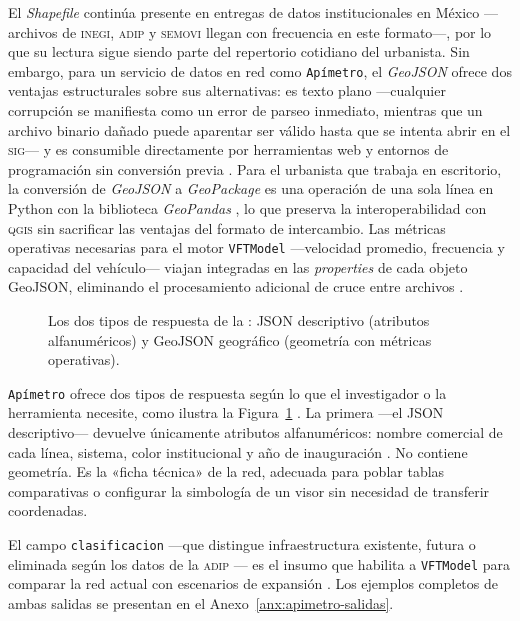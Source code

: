 El \textit{Shapefile} continúa presente en entregas de datos institucionales en
México —archivos de \textsc{inegi}, \textsc{adip} y \textsc{semovi} llegan con
frecuencia en este formato—, por lo que su lectura sigue siendo parte del
repertorio cotidiano del urbanista. Sin embargo, para un servicio de datos en
red como \texttt{Apímetro}, el \textit{GeoJSON} ofrece dos ventajas
estructurales sobre sus alternativas: es texto plano —cualquier corrupción se
manifiesta como un error de parseo inmediato, mientras que un archivo binario
dañado puede aparentar ser válido hasta que se intenta abrir en el \textsc{sig}—
y es consumible directamente por herramientas web y entornos de programación sin
conversión previa \citep{butler2016geojson}. Para el urbanista que trabaja en
escritorio, la conversión de \textit{GeoJSON} a \textit{GeoPackage} es una
operación de una sola línea en Python con la biblioteca \textit{GeoPandas}
\citep{tycgis2025}, lo que preserva la interoperabilidad con \textsc{qgis} sin
sacrificar las ventajas del formato de intercambio. Las métricas operativas
necesarias para el motor \texttt{VFTModel} —velocidad promedio, frecuencia y
capacidad del vehículo— viajan integradas en las \textit{properties} de cada
objeto GeoJSON, eliminando el procesamiento adicional de cruce entre archivos
\citep{cabrera2026VFTModel}.

\label{subsec:estructura-geojson-descriptivo}

\begin{figure}[H]
    \centering
    
    \caption[Tipos de salida de \texttt{Apímetro}]{Los dos tipos de respuesta de
    la \api{}: JSON descriptivo (atributos alfanuméricos) y GeoJSON
    geográfico (geometría con métricas operativas).}
    \label{fig:apimetro-salidas-tipos}
\end{figure}

\texttt{Apímetro} ofrece dos tipos de respuesta según lo que el investigador o
la herramienta necesite, como ilustra la
Figura~\ref{fig:apimetro-salidas-tipos} . La primera —el JSON descriptivo— devuelve
únicamente atributos alfanuméricos: nombre comercial de cada línea, sistema,
color institucional y año de inauguración \citep{bray2017json}. No contiene
geometría. Es la «ficha técnica» de la red, adecuada para poblar tablas
comparativas o configurar la simbología de un visor sin necesidad de transferir
coordenadas.

El campo \texttt{clasificacion} —que distingue infraestructura existente, futura
o eliminada según los datos de la \textsc{adip} \citep{adip_gtfs_2024}— es el
insumo que habilita a \texttt{VFTModel} para comparar la red actual con
escenarios de expansión \citep{cabrera2026VFTModel}. Los ejemplos completos de
ambas salidas se presentan en el Anexo~\ref{anx:apimetro-salidas}.

